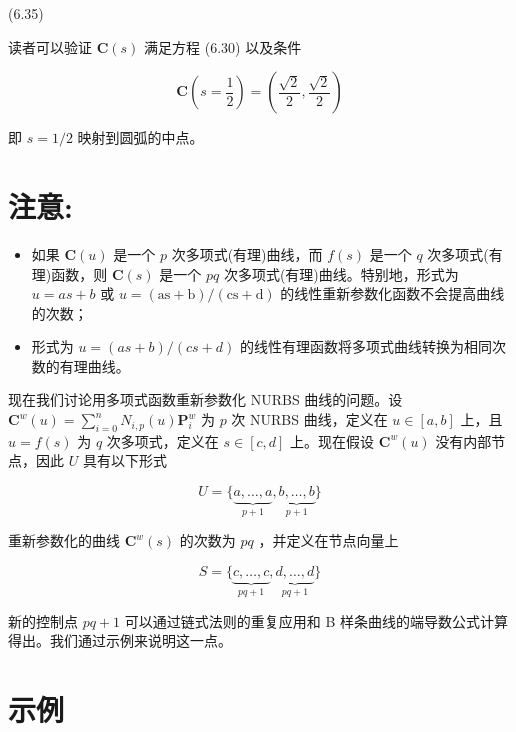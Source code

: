 \documentclass[../main.tex]{subfiles}
\begin{document}
(6.35)

读者可以验证 \(\mathbf{C}\left( s\right)\) 满足方程 (6.30) 以及条件

\[
\mathbf{C}\left( {s = \frac{1}{2}}\right)  = \left( {\frac{\sqrt{2}}{2},\frac{\sqrt{2}}{2}}\right)  \tag{6.36}
\]

即 \(s = 1/2\) 映射到圆弧的中点。

\section*{注意:}

\begin{itemize}
\item 如果 \(\mathbf{C}\left( u\right)\) 是一个 \(p\) 次多项式(有理)曲线，而 \(f\left( s\right)\) 是一个 \(q\) 次多项式(有理)函数，则 \(\mathbf{C}\left( s\right)\) 是一个 \({pq}\) 次多项式(有理)曲线。特别地，形式为 \(u = {as} + b\) 或 \(u = \left( {\mathrm{{as}} + \mathrm{b}}\right) /\left( {\mathrm{{cs}} + \mathrm{d}}\right)\) 的线性重新参数化函数不会提高曲线的次数；
\end{itemize}

\begin{itemize}
\item 形式为 \(u = \left( {{as} + b}\right) /\left( {{cs} + d}\right)\) 的线性有理函数将多项式曲线转换为相同次数的有理曲线。
\end{itemize}

现在我们讨论用多项式函数重新参数化 NURBS 曲线的问题。设 \({\mathbf{C}}^{w}\left( u\right)  = \mathop{\sum }\limits_{{i = 0}}^{n}{N}_{i,p}\left( u\right) {\mathbf{P}}_{i}^{w}\) 为 \(p\) 次 NURBS 曲线，定义在 \(u \in  \left\lbrack  {a,b}\right\rbrack\) 上，且 \(u = f\left( s\right)\) 为 \(q\) 次多项式，定义在 \(s \in  \left\lbrack  {c,d}\right\rbrack\) 上。现在假设 \({\mathbf{C}}^{w}\left( u\right)\) 没有内部节点，因此 \(U\) 具有以下形式

\[
U = \{ \underset{p + 1}{\underbrace{a,\ldots ,a}},\underset{p + 1}{\underbrace{b,\ldots ,b}}\}
\]

重新参数化的曲线 \({\mathbf{C}}^{w}\left( s\right)\) 的次数为 \({pq}\) ，并定义在节点向量上

\[
S = \{ \underset{{pq} + 1}{\underbrace{c,\ldots ,c}},\underset{{pq} + 1}{\underbrace{d,\ldots ,d}}\}  \tag{6.37}
\]

新的控制点 \({pq} + 1\) 可以通过链式法则的重复应用和 B 样条曲线的端导数公式计算得出。我们通过示例来说明这一点。

\section*{示例}
\end{document}
